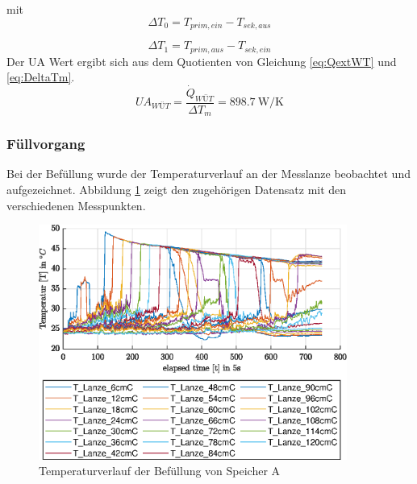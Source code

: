 mit
\begin{equation}
	\label{eq:DeltaT0}
	\Delta T_{0} = T_{prim,ein} - T_{sek,aus}
\end{equation}

\begin{equation}
	\label{eq:DeltaT1}
	\Delta T_{1} = T_{prim,aus} - T_{sek,ein}
\end{equation}
Der UA Wert ergibt sich aus dem Quotienten von Gleichung \ref{eq:QextWT} und \ref{eq:DeltaTm}.
\begin{equation}
	\label{eq:UAext}
	UA_{WÜT} = \frac{\dot Q_{WÜT}}{\Delta T_{m}} = \SI{898,7}{\watt\per\kelvin}
\end{equation}

\subsubsection{Füllvorgang}
Bei der Befüllung wurde der Temperaturverlauf an der Messlanze beobachtet und aufgezeichnet. Abbildung \ref{fig:SpAfill} zeigt den zugehörigen Datensatz mit den verschiedenen Messpunkten.

\begin{figure}[H]
	\centering
	\includegraphics[width=0.9\textwidth]{../DATA/SpA_Lanzen.eps}
	\caption[Temperaturverlauf Speicher A]{Temperaturverlauf der Befüllung von Speicher A}
	\label{fig:SpAfill}
\end{figure}

